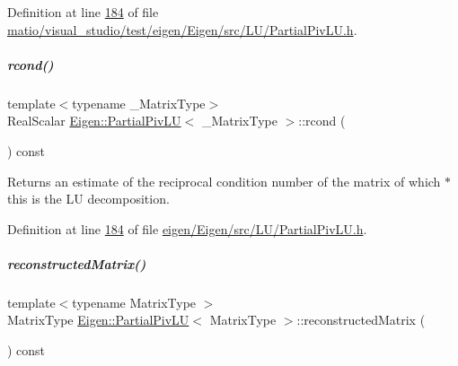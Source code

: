 Definition at line \hyperlink{matio_2visual__studio_2test_2eigen_2_eigen_2src_2_l_u_2_partial_piv_l_u_8h_source_l00184}{184} of file \hyperlink{matio_2visual__studio_2test_2eigen_2_eigen_2src_2_l_u_2_partial_piv_l_u_8h_source}{matio/visual\+\_\+studio/test/eigen/\+Eigen/src/\+L\+U/\+Partial\+Piv\+L\+U.\+h}.

\mbox{\label{group___l_u___module_a472b46d5d9ff7c328e1dccc13805f690}} 
\subparagraph{\texorpdfstring{rcond()}{rcond()}\hspace{0.1cm}{\footnotesize\ttfamily [2/2]}}
{\footnotesize\ttfamily template$<$typename \+\_\+\+Matrix\+Type$>$ \\
Real\+Scalar \hyperlink{group___l_u___module_class_eigen_1_1_partial_piv_l_u}{Eigen\+::\+Partial\+Piv\+LU}$<$ \+\_\+\+Matrix\+Type $>$\+::rcond (\begin{DoxyParamCaption}{ }\end{DoxyParamCaption}) const\hspace{0.3cm}{\ttfamily [inline]}}

\begin{DoxyReturn}{Returns}
an estimate of the reciprocal condition number of the matrix of which {\ttfamily $\ast$this} is the LU decomposition. 
\end{DoxyReturn}


Definition at line \hyperlink{eigen_2_eigen_2src_2_l_u_2_partial_piv_l_u_8h_source_l00184}{184} of file \hyperlink{eigen_2_eigen_2src_2_l_u_2_partial_piv_l_u_8h_source}{eigen/\+Eigen/src/\+L\+U/\+Partial\+Piv\+L\+U.\+h}.

\mbox{\label{group___l_u___module_aba7f1ee83537b0d240ebf206503a4920}} 
\subparagraph{\texorpdfstring{reconstructed\+Matrix()}{reconstructedMatrix()}}
{\footnotesize\ttfamily template$<$typename Matrix\+Type $>$ \\
Matrix\+Type \hyperlink{group___l_u___module_class_eigen_1_1_partial_piv_l_u}{Eigen\+::\+Partial\+Piv\+LU}$<$ Matrix\+Type $>$\+::reconstructed\+Matrix (\begin{DoxyParamCaption}{ }\end{DoxyParamCaption}) const}

